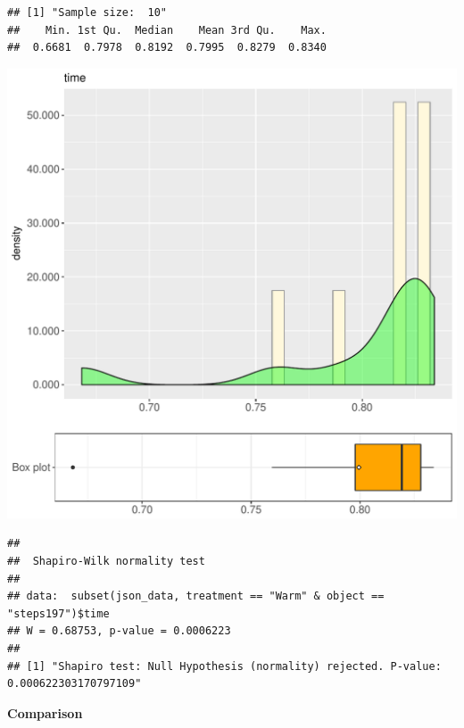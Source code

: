 \documentclass{article}\usepackage[]{graphicx}\usepackage[]{color}
\makeatletter
\def\maxwidth{ %
  \ifdim\Gin@nat@width>\linewidth
    \linewidth
  \else
    \Gin@nat@width
  \fi
}
\newenvironment{kframe}{%
 \def\at@end@of@kframe{}%
 \ifinner\ifhmode%
  \def\at@end@of@kframe{\end{minipage}}%
  \begin{minipage}{\columnwidth}%
 \fi\fi%
 \def\FrameCommand##1{\hskip\@totalleftmargin \hskip-\fboxsep
 \colorbox{shadecolor}{##1}\hskip-\fboxsep
     \hskip-\linewidth \hskip-\@totalleftmargin \hskip\columnwidth}%
 \MakeFramed {\advance\hsize-\width
   \@totalleftmargin\z@ \linewidth\hsize
   \@setminipage}}%
 {\par\unskip\endMakeFramed%
 \at@end@of@kframe}
\newenvironment{knitrout}{}{} %
\makeatother
\begin{document}
\begin{knitrout}
\color{fgcolor}\begin{kframe}
\begin{verbatim}
## [1] "Sample size:  10"
##    Min. 1st Qu.  Median    Mean 3rd Qu.    Max. 
##  0.6681  0.7978  0.8192  0.7995  0.8279  0.8340
\end{verbatim}
\end{kframe}
\includegraphics[width=\maxwidth]{figure/RH1_Warm_steps197-1} 
\begin{kframe}\begin{verbatim}
## 
## 	Shapiro-Wilk normality test
## 
## data:  subset(json_data, treatment == "Warm" & object == "steps197")$time
## W = 0.68753, p-value = 0.0006223
## 
## [1] "Shapiro test: Null Hypothesis (normality) rejected. P-value: 0.000622303170797109"
\end{verbatim}
\end{kframe}
\end{knitrout}
  
 \textbf{Comparison}
  
\end{document}
